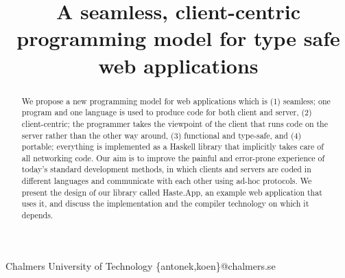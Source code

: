 \documentclass[preprint]{sigplanconf}
\begin{document}
\setlength{\pdfpageheight}{\paperheight}
\setlength{\pdfpagewidth}{\paperwidth}






\title{A seamless, client-centric programming model for type safe web applications}

           {Chalmers University of Technology}
           {\{antonek,koen\}@chalmers.se}

\maketitle

\begin{abstract}
We propose a new programming model for web applications which is (1)
seamless; one program and one language is used to produce code for
both client and server, (2) client-centric; the programmer takes the
viewpoint of the client that runs code on the server rather than the
other way around, (3) functional and type-safe, and (4) portable;
everything is implemented as a Haskell library that implicitly takes
care of all networking code. Our aim is to improve the painful and
error-prone experience of today's standard development methods,
in which clients and servers are coded in different languages and
communicate with each other using ad-hoc protocols.
We present the design of our library called Haste.App,
an example web application that uses it, and discuss
the implementation and the compiler technology on which it depends.
\end{abstract}
\end{document}
